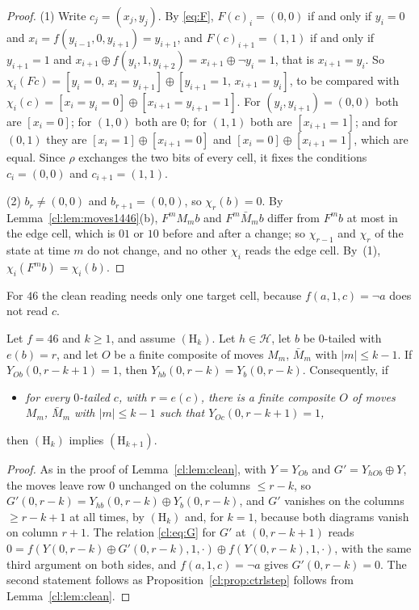\begin{proof}
(1) Write $c_j=(x_j,y_j)$. By \eqref{eq:F}, $F(c)_i=(0,0)$ if and only if $y_i=0$ and $x_i=f(y_{i-1},0,y_{i+1})=y_{i+1}$, and $F(c)_{i+1}=(1,1)$ if and only if $y_{i+1}=1$ and $x_{i+1}\oplus f(y_i,1,y_{i+2})=x_{i+1}\oplus\neg y_i=1$, that is $x_{i+1}=y_i$. So $\chi_i(Fc)=[y_i=0,\,x_i=y_{i+1}]\oplus[y_{i+1}=1,\,x_{i+1}=y_i]$, to be compared with $\chi_i(c)=[x_i=y_i=0]\oplus[x_{i+1}=y_{i+1}=1]$. For $(y_i,y_{i+1})=(0,0)$ both are $[x_i=0]$; for $(1,0)$ both are $0$; for $(1,1)$ both are $[x_{i+1}=1]$; and for $(0,1)$ they are $[x_i=1]\oplus[x_{i+1}=0]$ and $[x_i=0]\oplus[x_{i+1}=1]$, which are equal. Since $\rho$ exchanges the two bits of every cell, it fixes the conditions $c_i=(0,0)$ and $c_{i+1}=(1,1)$.

(2) $b_r\ne(0,0)$ and $b_{r+1}=(0,0)$, so $\chi_r(b)=0$. By Lemma~\ref{cl:lem:moves1446}(b), $F^mM_mb$ and $F^m\bar M_mb$ differ from $F^mb$ at most in the edge cell, which is $01$ or $10$ before and after a change; so $\chi_{r-1}$ and $\chi_r$ of the state at time $m$ do not change, and no other $\chi_i$ reads the edge cell. By~(1), $\chi_i(F^mb)=\chi_i(b)$.
\end{proof}

For $46$ the clean reading needs only one target cell, because $f(a,1,c)=\neg a$ does not read $c$.

\begin{lemma}\label{cl:lem:clean46}
Let $f=46$ and $k\ge1$, and assume $(\mathrm H_k)$. Let $h\in\mathcal H$, let $b$ be $0$-tailed with $e(b)=r$, and let $O$ be a finite composite of moves $M_m$, $\bar M_m$ with $|m|\le k-1$. If $Y_{Ob}(0,r-k+1)=1$, then $Y_{hb}(0,r-k)=Y_b(0,r-k)$. Consequently, if
\begin{itemize}
\item[$(\mathrm{CTRL}'_k)$] \emph{for every $0$-tailed $c$, with $r=e(c)$, there is a finite composite $O$ of moves $M_m$, $\bar M_m$ with $|m|\le k-1$ such that $Y_{Oc}(0,r-k+1)=1$,}
\end{itemize}
then $(\mathrm H_k)$ implies $(\mathrm H_{k+1})$.
\end{lemma}

\begin{proof}
As in the proof of Lemma~\ref{cl:lem:clean}, with $Y=Y_{Ob}$ and $G'=Y_{hOb}\oplus Y$, the moves leave row $0$ unchanged on the columns $\le r-k$, so $G'(0,r-k)=Y_{hb}(0,r-k)\oplus Y_b(0,r-k)$, and $G'$ vanishes on the columns $\ge r-k+1$ at all times, by $(\mathrm H_k)$ and, for $k=1$, because both diagrams vanish on column $r+1$. The relation \eqref{cl:eq:G} for $G'$ at $(0,r-k+1)$ reads $0=f(Y(0,r-k)\oplus G'(0,r-k),1,\cdot)\oplus f(Y(0,r-k),1,\cdot)$, with the same third argument on both sides, and $f(a,1,c)=\neg a$ gives $G'(0,r-k)=0$. The second statement follows as Proposition~\ref{cl:prop:ctrlstep} follows from Lemma~\ref{cl:lem:clean}.
\end{proof}

